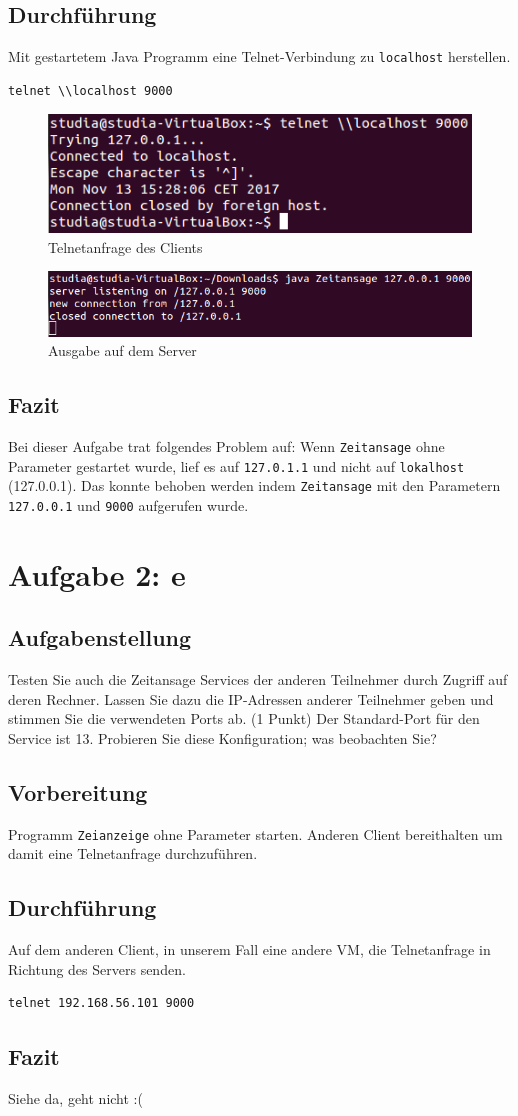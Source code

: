 \subsection{Durchführung}
Mit gestartetem Java Programm eine Telnet-Verbindung zu \texttt{localhost} herstellen.
\begin{lstlisting}
telnet \\localhost 9000
\end{lstlisting}
\begin{figure}[H]
	\centering
	\includegraphics[width=0.4 \linewidth]{images/17}
	\caption{Telnetanfrage des Clients}
\end{figure}
\begin{figure}[H]
	\centering
	\includegraphics[width=0.4 \linewidth]{images/16}
	\caption{Ausgabe auf dem Server}
\end{figure}

\subsection{Fazit}
Bei dieser Aufgabe trat folgendes Problem auf: Wenn \texttt{Zeitansage} ohne Parameter gestartet wurde, lief es auf \texttt{127.0.1.1} und nicht auf \texttt{lokalhost} (127.0.0.1). Das konnte behoben werden indem \texttt{Zeitansage} mit den Parametern \texttt{127.0.0.1} und \texttt{9000} aufgerufen wurde.

\section{Aufgabe 2: e}

\subsection{Aufgabenstellung}
Testen Sie auch die Zeitansage Services der anderen Teilnehmer durch Zugriff auf deren Rechner. Lassen Sie dazu die IP-Adressen anderer Teilnehmer geben und stimmen Sie die verwendeten Ports ab. (1 Punkt)
Der Standard-Port für den Service ist 13. Probieren Sie diese Konfiguration; was beobachten Sie?


\subsection{Vorbereitung}
Programm \texttt{Zeianzeige} ohne Parameter starten. Anderen Client bereithalten um damit eine Telnetanfrage durchzuführen.

\subsection{Durchführung}
Auf dem anderen Client, in unserem Fall eine andere VM, die Telnetanfrage in Richtung des Servers senden.

\begin{lstlisting}
telnet 192.168.56.101 9000
\end{lstlisting}

\subsection{Fazit}
Siehe da, geht nicht :(